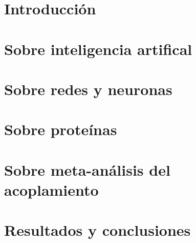 \documentclass[letterpaper,12pt]{book}
\begin{document}
\newpage
\thispagestyle{empty}
\mbox{}
\frontmatter
    
    \tableofcontents

\mainmatter
    \chapter*{Introducción}
        
    \chapter{Sobre inteligencia artifical}
        
    \chapter{Sobre redes y neuronas}
        
    \chapter{Sobre proteínas}
        
    \chapter{Sobre meta-análisis del acoplamiento}
        
    \chapter{Resultados y conclusiones}
        




\backmatter
    \nocite{*}
    \printbibliography
\end{document}
